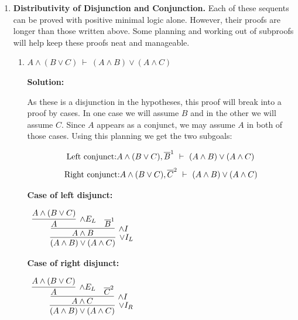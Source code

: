 \documentclass[11pt]{report}
\newcommand{\temp}[2]{{\overline{#2}}^{#1}}
\begin{document}
\begin{enumerate}
\begin{enumerate}
		Combining these with $\land$-introduction is the final piece in the proof. 
		\begin{center}
			$\begin{array}{c} 
				\infer[\to I, 1]{A \to (B \land C)}
					{\infer[\land I]{B \land C}
						{\infer[\MP]{B}
							{\infer[\land E_{L}]{A \to B}{(A \to B) \land (A \to C)}
							&
							\temp{1}{A}}
							&
						\infer[\MP]{C}
							{\infer[\land E_{R}]{A \to C}{(A \to B) \land (A \to C)}
							&
							\temp{1}{A}}}}
			\end{array}$
		\end{center}


	\end{enumerate}	

	\newpage
	\item \textbf{Distributivity of Disjunction and Conjunction.} Each of these sequents can be proved with positive minimal logic alone. However, their proofs are longer than those written above. Some planning and working out of subproofs will help keep these proofs neat and manageable. 

	\begin{enumerate}
		\item $A \land (B \lor C) \ \vdash \ (A \land B) \lor (A \land C)$
		
		\textbf{Solution:}

		As these is a disjunction in the hypotheses, this proof will break into a proof by cases. In one case we will assume $B$ and in the other we will assume $C$. Since $A$ appears as a conjunct, we may assume $A$ in both of those cases. Using this planning we get the two subgoals: 

		$$\textnormal{Left conjunct:} A \land (B \lor C), \temp{1}{B} \ \vdash \ (A \land B) \lor (A \land C)$$
		$$\textnormal{Right conjunct:} A \land (B \lor C), \temp{2}{C} \ \vdash \ (A \land B) \lor (A \land C)$$

		\textbf{Case of left disjunct:}

		\begin{center}
			$\begin{array}{c}
				\infer[\lor I_{L}]{(A \land B) \lor (A \land C)}
					{\infer[\land I]{A \land B}
						{\infer[\land E_{L}]{A}{A \land (B \lor C)}
							&
						\temp{1}{B}}}
			\end{array}$
		\end{center}

		\textbf{Case of right disjunct:}

		\begin{center}
			$\begin{array}{c}
				\infer[\lor I_{R}]{(A \land B) \lor (A \land C)}
					{\infer[\land I]{A \land C}
						{\infer[\land E_{L}]{A}{A \land (B \lor C)}
							&
						\temp{2}{C}}}
			\end{array}$
		\end{center}


\end{enumerate}
\end{enumerate}
\end{document}
